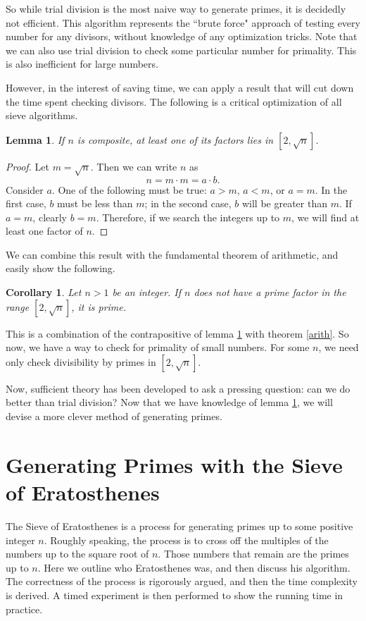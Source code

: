 \documentclass{amsart}
\newtheorem{lem}{Lemma}
\newtheorem{cor}{Corollary}
\theoremstyle{definition}
\theoremstyle{case}
\begin{document}
	So while trial division is the most naive way to generate primes, it is decidedly not efficient. This algorithm represents the ``brute force" approach of testing every number for any divisors, without knowledge of any optimization tricks. Note that we can also use trial division to check some particular number for primality. This is also inefficient for large numbers.
	
	However, in the interest of saving time, we can apply a result that will cut down the time spent checking divisors. The following is a critical optimization of all sieve algorithms.
	\begin{lem}\label{sqrt}
		If $n$ is composite, at least one of its factors lies in $[2, \sqrt{n}]$.
	\end{lem}
	\begin{proof}
		Let $m = \sqrt{n}$. Then we can write $n$ as
		$$ n = m \cdot m = a \cdot b . $$
		Consider $a$. One of the following must be true: $a>m$, $a<m$, or $a=m$. In the first case, $b$ must be less than $m$; in the second case, $b$ will be greater than $m$. If $a=m$, clearly $b=m$. Therefore, if we search the integers up to $m$, we will find at least one factor of $n$.
	\end{proof}
	
	We can combine this result with the fundamental theorem of arithmetic, and easily show the following.
	\begin{cor}\label{corprime}
		Let $n>1$ be an integer. If $n$ does not have a prime factor in the range $[2, \sqrt{n}]$, it is prime.
	\end{cor}
	This is a combination of the contrapositive of lemma \ref{sqrt} with theorem \ref{arith}. So now, we have a way to check for primality of small numbers. For some $n$, we need only check divisibility by primes in $[2, \sqrt{n}]$.
	
	Now, sufficient theory has been developed to ask a pressing question: can we do better than trial division? Now that we have knowledge of lemma \ref{sqrt}, we will devise a more clever method of generating primes.
	
	
	
	
	\section{Generating Primes with the Sieve of Eratosthenes}
	
	The Sieve of Eratosthenes is a process for generating primes up to some positive integer $n$. Roughly speaking, the process is to cross off the multiples of the numbers up to the square root of $n$. Those numbers that remain are the primes up to $n$. Here we outline who Eratosthenes was, and then discuss his algorithm. The correctness of the process is rigorously argued, and then the time complexity is derived. A timed experiment is then performed to show the running time in practice.
	
\end{document}
